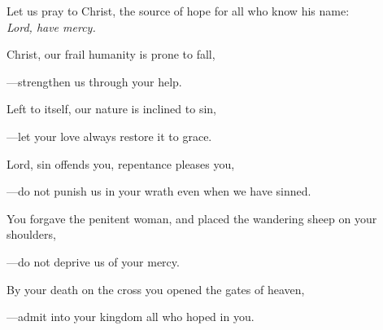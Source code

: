 \intercessions\indent

\begin{hangpar}

Let us pray to Christ, the source of hope for all who know his name:\\
\emph{Lord, have mercy.}

\medskip Christ, our frail humanity is prone to fall,

{\color{red}---\thinspace}strengthen us through your help.

\medskip Left to itself, our nature is inclined to sin,

{\color{red}---\thinspace}let your love always restore it to grace.

\medskip Lord, sin offends you, repentance pleases you,

{\color{red}---\thinspace}do not punish us in your wrath even when we have sinned.

\medskip You forgave the penitent woman, and placed the wandering sheep on your shoulders,

{\color{red}---\thinspace}do not deprive us of your mercy.

\medskip By your death on the cross you opened the gates of heaven,

{\color{red}---\thinspace}admit into your kingdom all who hoped in you.

\end{hangpar}


